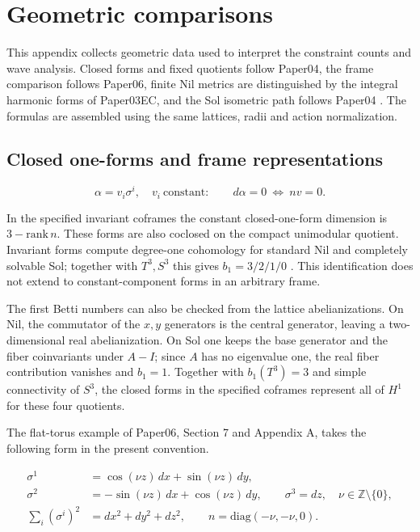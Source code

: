 \section{Geometric comparisons}

This appendix collects geometric data used to interpret the constraint counts and wave analysis. Closed forms and fixed quotients follow Paper04, the frame comparison follows Paper06, finite Nil metrics are distinguished by the integral harmonic forms of Paper03EC, and the Sol isometric path follows Paper04 \cite{paper3ec,paper4,paper6}. The formulas are assembled using the same lattices, radii and action normalization.

\subsection{Closed one-forms and frame representations}

\begin{equation}\tag{G-02}\label{eq:G-02}
\alpha=v_i\sigma^i,\quad v_i\ \text{constant}:\qquad d\alpha=0\ \Longleftrightarrow\ nv=0.
\end{equation}

In the specified invariant coframes the constant closed-one-form dimension is $3-\mathrm{rank}\,n$. These forms are also coclosed on the compact unimodular quotient. Invariant forms compute degree-one cohomology for standard Nil and completely solvable Sol; together with $T^3,S^3$ this gives $b_1=3/2/1/0$ \cite{Nomizu1954,Hattori1960}. This identification does not extend to constant-component forms in an arbitrary frame.

The first Betti numbers can also be checked from the lattice abelianizations. On Nil, the commutator of the $x,y$ generators is the central generator, leaving a two-dimensional real abelianization. On Sol one keeps the base generator and the fiber coinvariants under $A-I$; since $A$ has no eigenvalue one, the real fiber contribution vanishes and $b_1=1$. Together with $b_1(T^3)=3$ and simple connectivity of $S^3$, the closed forms in the specified coframes represent all of $H^1$ for these four quotients.

The flat-torus example of Paper06, Section 7 and Appendix A, takes the following form in the present convention.

\begin{equation}\tag{G-03}\label{eq:G-03}
\begin{aligned}\sigma^1&=\cos(\nu z)\,dx+\sin(\nu z)\,dy,\\ \sigma^2&=-\sin(\nu z)\,dx+\cos(\nu z)\,dy,\qquad \sigma^3=dz,\quad \nu\in\mathbb Z\setminus\{0\},\\ \sum_i(\sigma^i)^2&=dx^2+dy^2+dz^2,\qquad n=\mathrm{diag}(-\nu,-\nu,0).\end{aligned}
\end{equation}

